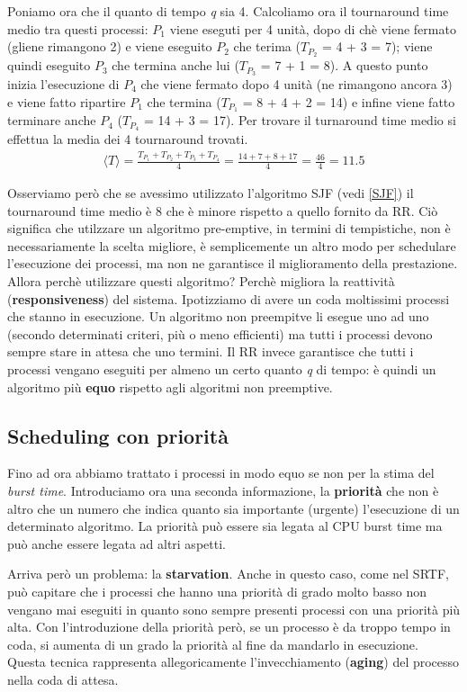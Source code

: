 \noindent Poniamo ora che il quanto di tempo \textit{q} sia 4. Calcoliamo ora il tournaround time medio tra questi processi: $P_1$ viene eseguti per 4 unità, dopo di chè viene fermato (gliene rimangono 2) e viene eseguito $P_2$ che terima ($T_{P_2}$ = 4 + 3 = 7); viene quindi eseguito $P_3$ che termina anche lui ($T_{P_3}$ = 7 + 1 = 8). A questo punto inizia l'esecuzione di $P_4$ che viene fermato dopo 4 unità (ne rimangono ancora 3) e viene fatto ripartire $P_1$ che termina ($T_{P_1}$ = 8 + 4 + 2 = 14) e infine viene fatto terminare anche $P_4$ ($T_{P_4}$ = 14 + 3 = 17). Per trovare il turnaround time medio si effettua la media dei 4 tournaround trovati.
\begin{gather*}
    \langle T \rangle = \frac{ T_{P_1} + T_{P_2} + T_{P_3} + T_{P_4}}{4} = \frac{14 + 7 + 8 + 17}{4} = \frac{46}{4} = 11.5
\end{gather*}

Osserviamo però che se avessimo utilizzato l'algoritmo SJF (vedi \ref{SJF}) il tournaround time medio è 8 che è minore rispetto a quello fornito da RR. Ciò significa che utilzzare un algoritmo pre-emptive, in termini di tempistiche, non è necessariamente la scelta migliore, è semplicemente un altro modo per schedulare l'esecuzione dei processi, ma non ne garantisce il miglioramento della prestazione. Allora perchè utilizzare questi algoritmo? Perchè migliora la reattività (\textbf{responsiveness}) del sistema. Ipotizziamo di avere un coda moltissimi processi che stanno in esecuzione. Un algoritmo non preempitve li esegue uno ad uno (secondo determinati criteri, più o meno efficienti) ma tutti i processi devono sempre stare in attesa che uno termini. Il RR invece garantisce che tutti i processi vengano eseguiti per almeno un certo quanto \textit{q} di tempo: è quindi un algoritmo più \textbf{equo} rispetto agli algoritmi non preemptive.

% 
\subsection{Scheduling con priorità} \label{priority scheduling}
Fino ad ora abbiamo trattato i processi in modo equo se non per la stima del \textit{burst time}. Introduciamo ora una seconda informazione, la \textbf{priorità} che non è altro che un numero che indica quanto sia importante (urgente) l'esecuzione di un determinato algoritmo. La priorità può essere sia legata al CPU burst time ma può anche essere legata ad altri aspetti. 

Arriva però un problema: la \textbf{starvation}. Anche in questo caso, come nel SRTF, può capitare che i processi che hanno una priorità di grado molto basso non vengano mai eseguiti in quanto sono sempre presenti processi con una priorità più alta. Con l'introduzione della priorità però, se un processo è da troppo tempo in coda, si aumenta di un grado la priorità al fine da mandarlo in esecuzione. Questa tecnica rappresenta allegoricamente l'invecchiamento (\textbf{aging}) del processo nella coda di attesa. 

